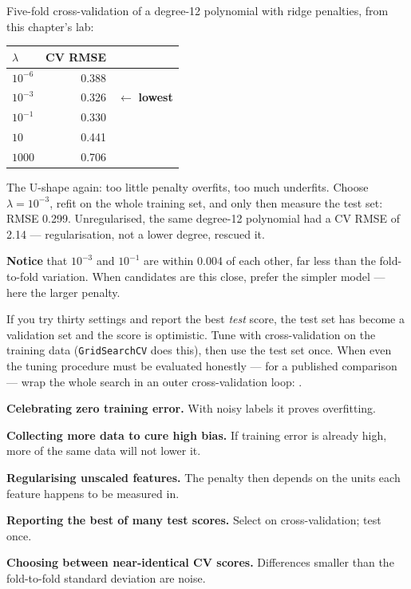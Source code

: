 \begin{worked}
Five-fold cross-validation of a degree-12 polynomial with ridge penalties,
from this chapter's lab:

\smallskip
\begin{center}
\begin{tabular}{@{}lrl@{}}
\toprule
$\lambda$ & \textbf{CV RMSE} & \\
\midrule
$10^{-6}$ & 0.388 & \\
$10^{-3}$ & 0.326 & $\leftarrow$ \textbf{lowest} \\
$10^{-1}$ & 0.330 & \\
$10$ & 0.441 & \\
$1000$ & 0.706 & \\
\bottomrule
\end{tabular}
\end{center}

\smallskip
The U-shape again: too little penalty overfits, too much underfits. Choose
$\lambda = 10^{-3}$, refit on the whole training set, and only then measure the
test set: RMSE 0.299. Unregularised, the same degree-12 polynomial had a CV RMSE of
2.14 --- regularisation, not a lower degree, rescued it.

\textbf{Notice} that $10^{-3}$ and $10^{-1}$ are within 0.004 of each other, far less
than the fold-to-fold variation. When candidates are this close, prefer the
simpler model --- here the larger penalty.
\end{worked}

\begin{alertbox}
If you try thirty settings and report the best \emph{test} score, the test set has
become a validation set and the score is optimistic. Tune with cross-validation on
the training data (\texttt{GridSearchCV} does this), then use the test set once.
When even the tuning procedure must be evaluated honestly --- for a published
comparison --- wrap the whole search in an outer cross-validation loop:
.
\end{alertbox}

\begin{pitfall}
\begin{tight}
  \item \textbf{Celebrating zero training error.} With noisy labels it proves
        overfitting.
  \item \textbf{Collecting more data to cure high bias.} If training error is
        already high, more of the same data will not lower it.
  \item \textbf{Regularising unscaled features.} The penalty then depends on the
        units each feature happens to be measured in.
  \item \textbf{Reporting the best of many test scores.} Select on
        cross-validation; test once.
  \item \textbf{Choosing between near-identical CV scores.} Differences smaller
        than the fold-to-fold standard deviation are noise.
\end{tight}
\end{pitfall}

